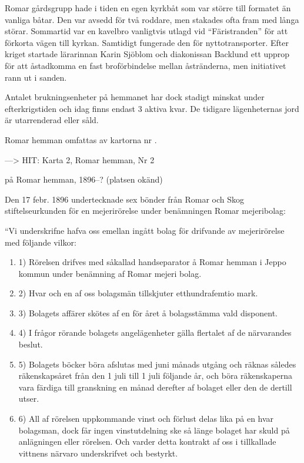 Romar gårdsgrupp hade i tiden en egen kyrkbåt som var större till formatet än vanliga båtar. Den var avsedd för två roddare, men stakades ofta fram med långa störar. Sommartid var en kavelbro vanligtvis utlagd vid ``Färistranden'' för att förkorta vägen till kyrkan. Samtidigt fungerade den för nyttotransporter. Efter kriget startade lärarinnan Karin Sjöblom och diakonissan Backlund ett upprop för att åstadkomma en fast broförbindelse mellan åstränderna, men initiativet rann ut i sanden.

Antalet brukningsenheter på hemmanet har dock stadigt minskat under efterkrigstiden och idag finns endast 3 aktiva kvar. De tidigare lägenheternas jord är utarrenderad eller såld.


Romar hemman omfattas av kartorna nr .


---> HIT: Karta 2, Romar hemman, Nr 2


 på Romar hemman, 1896--? (platsen okänd)

Den 17 febr. 1896 undertecknade sex bönder från Romar och Skog stiftelseurkunden för en mejerirörelse under benämningen Romar mejeribolag:

``Vi underskrifne hafva oss emellan ingått bolag för drifvande av mejerirörelse med följande vilkor:
\begin{enumerate}
  \item 1) Rörelsen drifves med såkallad handseparator å Romar hemman i Jeppo kommun under benämning af Romar mejeri bolag.
  \item 2) Hvar och en af oss bolagsmän tillskjuter etthundrafemtio mark.
  \item 3) Bolagets affärer skötes af en för året å bolagsstämma vald disponent.
  \item 4) I frågor rörande bolagets angelägenheter gälla flertalet af de närvarandes beslut.
  \item 5) Bolagets böcker böra afslutas med juni månads utgång och räknas således räkenskapsåret från den 1 juli till 1 juli följande år, och böra räkenskaperna vara färdiga till granskning en månad derefter af bolaget eller den de dertill utser.
  \item 6) All af rörelsen uppkommande vinst och förlust delas lika på en hvar bolagsman, dock får ingen vinstutdelning ske så länge bolaget har skuld på anlägningen eller rörelsen. Och varder detta kontrakt af oss i tillkallade vittnens närvaro underskrifvet och bestyrkt.
\end{enumerate}

